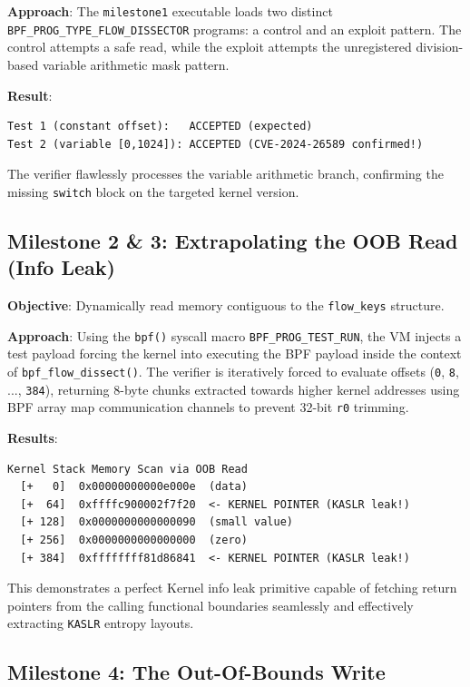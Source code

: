 \textbf{Approach}: The \texttt{milestone1} executable loads two distinct \texttt{BPF\_PROG\_TYPE\_FLOW\_DISSECTOR} programs: a control and an exploit pattern. The control attempts a safe read, while the exploit attempts the unregistered division-based variable arithmetic mask pattern.

\textbf{Result}:
\begin{lstlisting}[style=log]
Test 1 (constant offset):   ACCEPTED (expected)
Test 2 (variable [0,1024]): ACCEPTED (CVE-2024-26589 confirmed!)
\end{lstlisting}
The verifier flawlessly processes the variable arithmetic branch, confirming the missing \texttt{switch} block on the targeted kernel version.

\subsection{Milestone 2 \& 3: Extrapolating the OOB Read (Info Leak)}

\textbf{Objective}: Dynamically read memory contiguous to the \texttt{flow\_keys} structure. 

\textbf{Approach}: Using the \texttt{bpf()} syscall macro \texttt{BPF\_PROG\_TEST\_RUN}, the VM injects a test payload forcing the kernel into executing the BPF payload inside the context of \texttt{bpf\_flow\_dissect()}. The verifier is iteratively forced to evaluate offsets (\texttt{0}, \texttt{8}, ..., \texttt{384}), returning 8-byte chunks extracted towards higher kernel addresses using BPF array map communication channels to prevent 32-bit \texttt{r0} trimming.

\textbf{Results}:
\begin{lstlisting}[style=log,caption={Milestones stack scanning}]
  Kernel Stack Memory Scan via OOB Read
  [+   0]  0x00000000000e000e  (data)
  [+  64]  0xffffc900002f7f20  <- KERNEL POINTER (KASLR leak!)
  [+ 128]  0x0000000000000090  (small value)
  [+ 256]  0x0000000000000000  (zero)
  [+ 384]  0xffffffff81d86841  <- KERNEL POINTER (KASLR leak!)
\end{lstlisting}

This demonstrates a perfect Kernel info leak primitive capable of fetching return pointers from the calling functional boundaries seamlessly and effectively extracting \texttt{KASLR} entropy layouts.

\subsection{Milestone 4: The Out-Of-Bounds Write}

